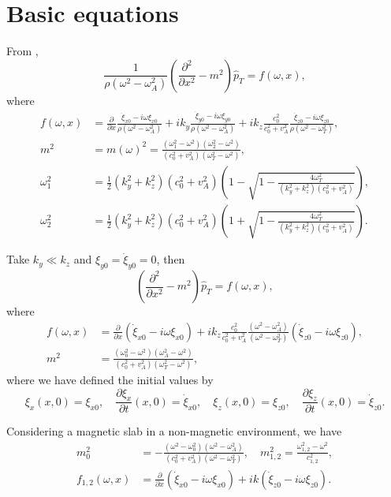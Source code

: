 \documentclass[12pt]{../style-files/ociamthesis}
\begin{document}
\section{Basic equations}
From \cite{and_etal07},
\begin{equation}
\frac{1}{\rho(\omega^2 - \omega_A^2)} \left( \frac{\partial^2}{\partial x^2} - m^2 \right) \hat{p}_T = f(\omega, x),
\end{equation}
where
\begin{align}
f(\omega, x) &= \frac{\partial}{\partial x} \frac{\dot{\xi}_{x0} - i\omega\xi_{x0}}{\rho(\omega^2 - \omega_A^2)} + ik_y \frac{\dot{\xi}_{y0} - i\omega\xi_{y0}}{\rho(\omega^2 - \omega_A^2)} + ik_z \frac{c_0^2}{c_0^2 + v_A^2} \frac{\dot{\xi}_{z0} - i\omega\xi_{z0}}{\rho(\omega^2 - \omega_T^2)}, \\
m^2 &= m(\omega)^2 = \frac{(\omega_1^2 - \omega^2)(\omega_2^2 - \omega^2)}{(c_0^2 + v_A^2)(\omega_T^2 - \omega^2)}, \\
\omega_1^2 &= \frac{1}{2}(k_y^2 + k_z^2)(c_0^2 + v_A^2) \left( 1 - \sqrt{1 - \frac{4\omega_T^2}{(k_y^2 + k_z^2)(c_0^2 + v_A^2)}} \right), \\
\omega_2^2 &= \frac{1}{2}(k_y^2 + k_z^2)(c_0^2 + v_A^2) \left( 1 + \sqrt{1 - \frac{4\omega_T^2}{(k_y^2 + k_z^2)(c_0^2 + v_A^2)}} \right).
\end{align}

Take $k_y \ll k_z$ and $\xi_{y0} = \dot{\xi}_{y0} = 0$, then
\begin{equation}
\left( \frac{\partial^2}{\partial x^2} - m^2 \right) \hat{p}_T = f(\omega, x),
\end{equation}
where
\begin{align}
f(\omega, x) &= \frac{\partial}{\partial x} (\dot{\xi}_{x0} - i\omega\xi_{x0}) + ik_z \frac{c_0^2}{c_0^2 + v_A^2} \frac{(\omega^2 - \omega_A^2)}{(\omega^2 - \omega_T^2)} (\dot{\xi}_{z0} - i\omega\xi_{z0}), \\
m^2 &= \frac{(\omega_0^2 - \omega^2)(\omega_A^2 - \omega^2)}{(c_0^2 + v_A^2)(\omega_T^2 - \omega^2)},
\end{align}
where we have defined the initial values by
\begin{equation}
\xi_x(x, 0) = \xi_{x0}, \quad \frac{\partial{}\xi_x}{\partial{t}}(x, 0) = \dot{\xi}_{x0}, \quad \xi_z(x, 0) = \xi_{z0}, \quad \frac{\partial{}\xi_z}{\partial{t}}(x, 0) = \dot{\xi}_{z0}.
\end{equation}

Considering a magnetic slab in a non-magnetic environment, we have
\begin{align}
m_0^2 &= - \frac{(\omega^2 - \omega_0^2)(\omega^2 - \omega_A^2)}{(c_0^2 + v_A^2)(\omega^2 - \omega_T^2)}, \quad m_{1,2}^2 = \frac{\omega_{1,2}^2 - \omega^2}{c_{1,2}^2}, \\
f_{1,2}(\omega,x) &= \frac{\partial}{\partial x} (\dot{\xi}_{x0} - i\omega\xi_{x0}) + ik(\dot{\xi}_{z0} - i\omega\xi_{z0}).
\end{align}
\end{document}
